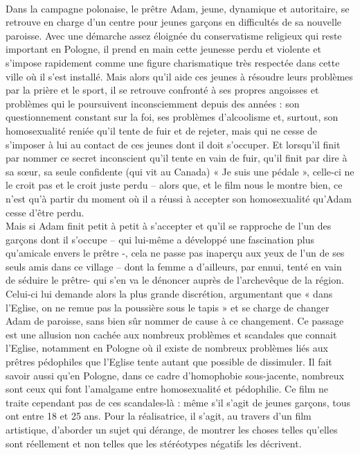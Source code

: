 \documentclass[12pt]{amsart}
\begin{document}
\paragraph{}
Dans la campagne polonaise, le prêtre Adam, jeune, dynamique et autoritaire, se retrouve en charge d’un centre pour jeunes garçons en difficultés de sa nouvelle paroisse. Avec une démarche assez éloignée du conservatisme religieux qui reste important en Pologne, il prend en main cette jeunesse perdu et violente et s’impose rapidement comme une figure charismatique très respectée dans cette ville où il s’est installé. Mais alors qu’il aide ces jeunes à résoudre leurs problèmes par la prière et le sport, il se retrouve confronté à ses propres angoisses et problèmes qui le poursuivent inconsciemment depuis des années : son questionnement constant sur la foi, ses problèmes d’alcoolisme et, surtout, son homosexualité reniée qu’il tente de fuir et de rejeter, mais qui ne cesse de s’imposer à lui au contact de ces jeunes dont il doit s’occuper. Et lorsqu’il finit par nommer ce secret inconscient qu’il tente en vain de fuir, qu’il finit par dire à sa sœur, sa seule confidente (qui vit au Canada) « Je suis une pédale », celle-ci ne le croit pas et le croit juste perdu – alors que, et le film nous le montre bien, ce n’est qu’à partir du moment où il a réussi à accepter son homosexualité qu’Adam cesse d’être perdu.\\
 Mais si Adam finit petit à petit à s’accepter et qu’il se rapproche de l’un des garçons dont il s’occupe – qui lui-même a développé une fascination plus qu’amicale envers le prêtre -, cela ne passe pas inaperçu aux yeux de l’un de ses seuls amis dans ce village – dont la femme a d’ailleurs, par ennui, tenté en vain de séduire le prêtre- qui s’en va le dénoncer auprès de l’archevêque de la région. Celui-ci lui demande alors la plus grande discrétion, argumentant que « dans l’Eglise, on ne remue pas la poussière sous le tapis » et se charge de changer Adam de paroisse, sans bien sûr nommer de cause à ce changement. Ce passage est une allusion non cachée aux nombreux problèmes et scandales que connait l’Eglise, notamment en Pologne où il existe de nombreux problèmes liés aux prêtres pédophiles que l’Eglise tente autant que possible de dissimuler. Il fait savoir aussi qu’en Pologne, dans ce cadre d’homophobie sous-jacente, nombreux sont ceux qui font l’amalgame entre homosexualité et pédophilie. Ce film ne traite cependant pas de ces scandales-là : même s’il s’agit de jeunes garçons, tous ont entre 18 et 25 ans. Pour la réalisatrice, il s’agit, au travers d’un film artistique, d’aborder un sujet qui dérange, de montrer les choses telles qu’elles sont réellement et non telles que les stéréotypes négatifs les décrivent. 
\end{document}
